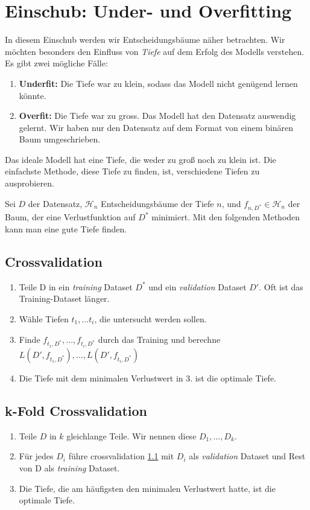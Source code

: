 \section{Einschub: Under- und Overfitting}
In diesem Einschub werden wir Entscheidungsbäume näher betrachten. Wir möchten besonders den Einfluss von \textit{Tiefe} auf dem Erfolg des Modells verstehen.\\ 

Es gibt zwei mögliche Fälle:
\begin{enumerate}
    \item \textbf{Underfit: } Die Tiefe war zu klein, sodass das Modell nicht genügend lernen könnte.
    \item \textbf{Overfit: } Die Tiefe war zu gross. Das Modell hat den Datensatz auswendig gelernt. Wir haben nur den Datensatz auf dem Format von einem binären Baum umgeschrieben.
\end{enumerate}
Das ideale Modell hat eine Tiefe, die weder zu groß noch zu klein ist. Die einfachste Methode, diese Tiefe zu finden, ist, verschiedene Tiefen zu ausprobieren. 

Sei $D$ der Datensatz, $\mathcal{H}_n$ Entscheidungsbäume der Tiefe $n$, und $f_{n,D^*} \in \mathcal{H}_n$ der Baum, der eine Verlustfunktion auf $D^*$ minimiert. Mit den folgenden Methoden kann man eine gute Tiefe finden.
\subsection{Crossvalidation} \label{ML-Crossval}
\begin{enumerate}
    \item Teile D in ein \textit{training} Dataset $D^*$ und ein \textit{validation} Dataset $D'$. Oft ist das Training-Dataset länger. 
    \item Wähle Tiefen $t_1,...t_i$, die untersucht werden sollen.
    \item Finde $f_{t_1,D^*},...,f_{t_i,D^*}$ durch das Training und berechne $L(D',f_{t_1,D^*}),...,L(D',f_{t_i,D^*})$
    \item  Die Tiefe mit dem minimalen Verlustwert in 3. ist die optimale Tiefe.

\end{enumerate}
\subsection{k-Fold Crossvalidation}
\begin{enumerate}
    \item Teile $D$ in $k$ gleichlange Teile. Wir nennen diese $D_1,...,D_k$. 
    \item Für jedes $D_i$ führe crossvalidation \ref{ML-Crossval} mit $D_i$ als \textit{validation} Dataset und Rest von D als \textit{training} Dataset. 
    \item Die Tiefe, die am häufigsten den minimalen Verlustwert hatte, ist die optimale Tiefe. 
\end{enumerate}

